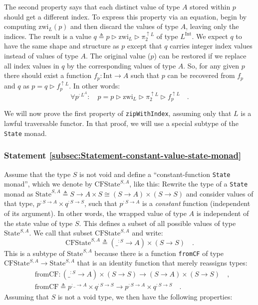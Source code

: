 The second property says that each distinct value of type $A$ stored
within $p$ should get a different index. To express this property
via an equation, begin by computing $\text{zwi}_{L}(p)$ and then
discard the values of type $A$, leaving only the indices. The result
is a value $q\triangleq p\triangleright\text{zwi}_{L}\triangleright\pi_{2}^{\uparrow L}$
of type $L^{\text{Int}}$. We expect $q$ to have the same shape and
structure as $p$ except that $q$ carries integer index values instead
of values of type $A$. The original value ($p$) can be restored
if we replace all index values in $q$ by the corresponding values
of type $A$. So, for any given $p$ there should exist a function
$f_{p}:\text{Int}\rightarrow A$ such that $p$ can be recovered from
$f_{p}$ and $q$ as $p=q\triangleright f_{p}^{\uparrow L}$. In other
words:
\[
\forall p^{:L^{A}}:\quad p=p\triangleright\text{zwi}_{L}\triangleright\pi_{2}^{\uparrow L}\triangleright f_{p}^{\uparrow L}\quad.
\]

We will now prove the first property of \lstinline!zipWithIndex!,
assuming only that $L$ is a lawful traversable functor. In that proof,
we will use a special subtype of the \lstinline!State! monad.

\subsubsection{Statement \label{subsec:Statement-constant-value-state-monad}\ref{subsec:Statement-constant-value-state-monad}}

Assume that the type $S$ is not void and define a \textsf{``}constant-function
\lstinline!State! monad\textsf{''}, which we denote by $\text{CFState}^{S,A}$,
like this: Rewrite the type of a \lstinline!State! monad  as $\text{State}^{S,A}\triangleq S\rightarrow A\times S\cong(S\rightarrow A)\times(S\rightarrow S)$
and consider values of that type, $p^{:S\rightarrow A}\times q^{:S\rightarrow S}$,
such that $p^{:S\rightarrow A}$ is a\emph{ constant} function (independent
of its argument). In other words, the wrapped value of type $A$ is
independent of the state value of type $S$. This defines a subset
of all possible values of type $\text{State}^{S,A}$. We call that
subset $\text{CFState}^{S,A}$ and write: 
\[
\text{CFState}^{S,A}\triangleq(\_^{:S}\rightarrow A)\times(S\rightarrow S)\quad.
\]
This is a subtype of $\text{State}^{S,A}$ because there is a function
\lstinline!fromCF! of type $\text{CFState}^{S,A}\rightarrow\text{State}^{S,A}$
that is an identity function that merely reassigns types:
\begin{align*}
 & \text{fromCF}:(\_^{:S}\rightarrow A)\times(S\rightarrow S)\rightarrow(S\rightarrow A)\times(S\rightarrow S)\quad,\\
 & \text{fromCF}\triangleq p^{:\_\rightarrow A}\times q^{:S\rightarrow S}\rightarrow p^{:S\rightarrow A}\times q^{:S\rightarrow S}\quad.
\end{align*}
Assuming that $S$ is not a void type, we then have the following
properties:

